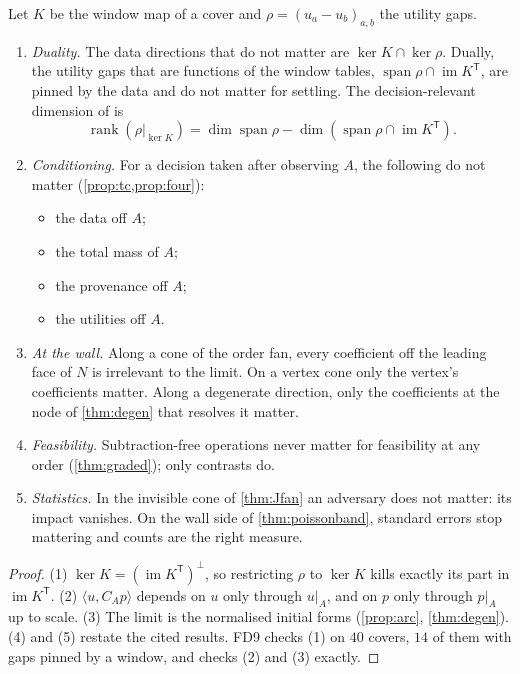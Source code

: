 \documentclass[11pt]{article}
\theoremstyle{definition}\newtheorem{definition}[theorem]{Definition}\newtheorem{remark}[theorem]{Remark}\newtheorem{example}[theorem]{Example}
\begin{document}
\begin{proposition}\label{prop:exclusion}
Let $K$ be the window map of a cover and $\rho=(u_a-u_b)_{a,b}$ the utility gaps.
\begin{enumerate}
\item[(1)] \emph{Duality.} The data directions that do not matter are $\ker K\cap\ker\rho$. Dually, the utility gaps that are functions of the window
  tables, $\operatorname{span}\rho\cap\operatorname{im}K^{\mathsf T}$, are pinned by the data and do not matter for settling. The decision-relevant dimension of
  \cite[Proposition ``the decision-relevant quotient'']{Lab} is
  \[
  \operatorname{rank}(\rho|_{\ker K})=\dim\operatorname{span}\rho-\dim(\operatorname{span}\rho\cap\operatorname{im}K^{\mathsf T}).
  \]
\item[(2)] \emph{Conditioning.} For a decision taken after observing $A$, the following do not matter (\cref{prop:tc,prop:four}):
  \begin{itemize}
  \item the data off $A$;
  \item the total mass of $A$;
  \item the provenance off $A$;
  \item the utilities off $A$.
  \end{itemize}
\item[(3)] \emph{At the wall.} Along a cone of the order fan, every coefficient off the leading face of $N$ is irrelevant to the limit. On a
  vertex cone only the vertex's coefficients matter. Along a degenerate direction, only the coefficients at the node of \cref{thm:degen}
  that resolves it matter.
\item[(4)] \emph{Feasibility.} Subtraction-free operations never matter for feasibility at any order (\cref{thm:graded}); only contrasts do.
\item[(5)] \emph{Statistics.} In the invisible cone of \cref{thm:Jfan} an adversary does not matter: its impact vanishes. On the wall side of
  \cref{thm:poissonband}, standard errors stop mattering and counts are the right measure.
\end{enumerate}
\end{proposition}

\begin{proof}
(1) $\ker K=(\operatorname{im}K^{\mathsf T})^\perp$, so restricting $\rho$ to $\ker K$ kills exactly its part in $\operatorname{im}K^{\mathsf T}$. (2) $\langle u,C_Ap\rangle$ depends on $u$ only through $u|_A$,
and on $p$ only through $p|_A$ up to scale. (3) The limit is the normalised initial forms (\cref{prop:arc}, \cref{thm:degen}). (4) and (5) restate the
cited results. FD9 checks (1) on $40$ covers, $14$ of them with gaps pinned by a window, and checks (2) and (3) exactly.
\end{proof}
\end{document}
